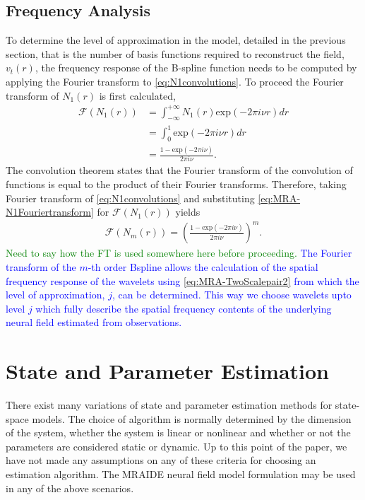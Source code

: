 \documentclass[11pt,draftcls,onecolumn,peerreview]{IEEEtran}
\newcommand{\dean}[1]{\textcolor{green}{#1}}
\newcommand{\parham}[1]{\textcolor{blue}{#1}}
\begin{document}
\subsection{Frequency Analysis}
To determine the level of approximation in the model, detailed in the previous section, that is the number of basis functions required to reconstruct the field, $v_t(r)$, the frequency response of the B-spline function needs to be computed by applying the Fourier transform to \eqref{eq:N1convolutions}. To proceed the Fourier transform of $N_1(r)$ is first calculated, 
\begin{align}\label{eq:MRA-N1Fouriertransform}
\mathcal F(N_1(r))&=\int_{-\infty}^{+\infty}N_1(r)\mathrm{exp}(-2\pi i \nu r)dr \nonumber \\
&=\int_{0}^{1} \mathrm{exp}(-2\pi i \nu r)dr \nonumber \\
&=\frac{1-\mathrm{exp}(-2\pi i \nu)}{2\pi i\nu}.
\end{align}
The convolution theorem states that the Fourier transform of the convolution of functions is equal to the product of their Fourier transforms. Therefore, taking Fourier transform of \eqref{eq:N1convolutions} and substituting \eqref{eq:MRA-N1Fouriertransform} for $\mathcal F(N_1(r)) $ yields
\begin{align}\label{eq:MRA-NmFouriertransform}
\mathcal F(N_m(r))=\left(\frac{1-\mathrm{exp}(-2\pi i \nu)}{2\pi i\nu}\right)^m.
\end{align}
\dean{Need to say how the FT is used somewhere here before proceeding.} \parham{The Fourier transform of the $m$-th order Bspline allows the calculation of the spatial frequency response of the wavelets using \eqref{eq:MRA-TwoScalepair2} from which the level of approximation, $j$, can be determined. This way we choose wavelets upto level $j$ which fully describe the spatial frequency contents of the underlying neural field estimated from observations.}


\section{State and Parameter Estimation}
There exist many variations of state and parameter estimation methods for state-space models. The choice of algorithm is normally determined by the dimension of the system, whether the system is linear or nonlinear and whether or not the parameters are considered static or dynamic. Up to this point of the paper, we have not made any assumptions on any of these criteria for choosing an estimation algorithm. The MRAIDE neural field model formulation may be used in any of the above scenarios. 
\end{document}
